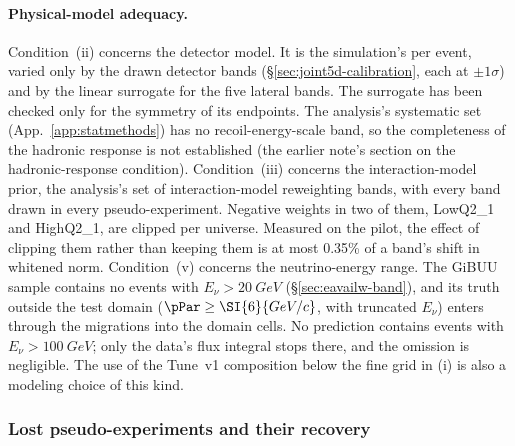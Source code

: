 \paragraph{Physical-model adequacy.} Condition~(ii) concerns the detector model. It is the simulation's per event, varied only by the drawn detector bands (\S\ref{sec:joint5d-calibration}, each at $\pm1\sigma$) and by the linear surrogate for the five lateral bands. The surrogate has been checked only for the symmetry of its endpoints. The analysis's systematic set (App.~\ref{app:statmethods}) has no recoil-energy-scale band, so the completeness of the hadronic response is not established (the earlier note's section on the hadronic-response condition). Condition~(iii) concerns the interaction-model prior, the analysis's set of \jtModelBands{} interaction-model reweighting bands, with every band drawn in every pseudo-experiment. Negative weights in two of them, LowQ2\_1 and HighQ2\_1, are clipped per universe. Measured on the pilot, the effect of clipping them rather than keeping them is at most 0.35\% of a band's shift in whitened norm. Condition~(v) concerns the neutrino-energy range. The GiBUU sample contains no events with $E_{\nu}>\SI{20}{GeV}$ (\S\ref{sec:eavailw-band}), and its truth outside the test domain ($\pPar\ge\SI{6}{GeV/c}$, with truncated $E_{\nu}$) enters through the migrations into the domain cells. No prediction contains events with $E_{\nu}>\SI{100}{GeV}$; only the data's flux integral stops there, and the omission is negligible. The use of the Tune~v1 composition below the fine grid in (i) is also a modeling choice of this kind.

\subsubsection{Lost pseudo-experiments and their recovery}

